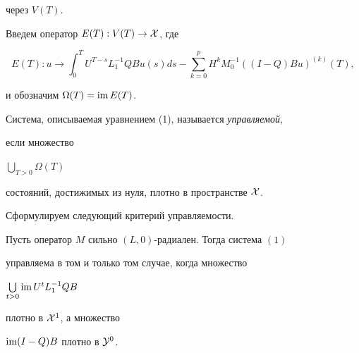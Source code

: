 через $V(T)$.





Введем оператор $E(T):V(T)\to {\cal X}$, где


$$


E(T): u\to \int_0^T U^{T-s}L^{-1}_1Q B u(s)ds


-\sum\limits_{k=0}^p H^k M_0^{-1}((I-Q)B u)^{(k)}(T),


$$


и обозначим $\Omega(T)=\operatorname{im} E(T)$.





Система, описываемая уравнением (1), называется {\it управляемой},


если множество


$\bigcup\limits_{T>0} \Omega(T)$


состояний, достижимых из нуля, плотно в пространстве ${\cal X}$.





Сформулируем следующий критерий управляемости.





\begin{thm}


Пусть оператор $M$ сильно $(L,0)$-радиален. Тогда система $(1)$


управляема в том и только том случае, когда множество


$\bigcup\limits_{t>0}\operatorname{im} U^t L_1^{-1}Q B$


плотно в ${\cal X}^1$, а множество\linebreak


$\operatorname{im} (I-Q)B$ плотно в ${\cal Y}^0$.


\end{thm}





